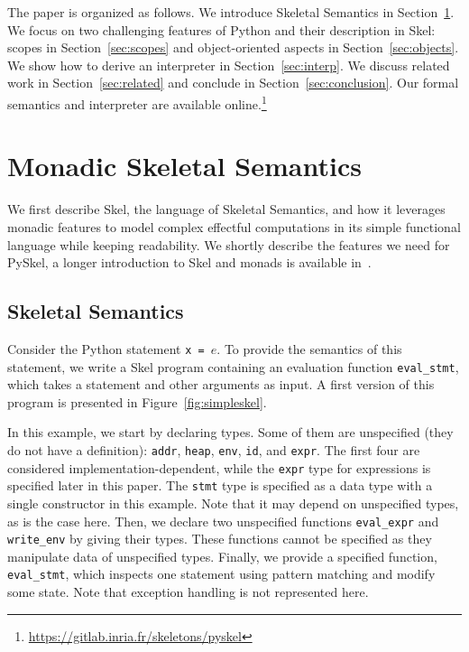 \documentclass[submission,copyright,creativecommons]{eptcs}
\newcommand{\skinl}[1]{\texttt{#1}}
\begin{document}
The paper is organized as follows. We introduce Skeletal Semantics in
Section~\ref{sec:skel}. We focus on two challenging features of Python and their
description in Skel: scopes in Section~\ref{sec:scopes} and
object-oriented aspects in Section~\ref{sec:objects}. We show how to derive an
interpreter in Section~\ref{sec:interp}. We discuss related work in
Section~\ref{sec:related} and conclude in Section~\ref{sec:conclusion}. Our
formal semantics and interpreter are available online.\footnote{\url{https://gitlab.inria.fr/skeletons/pyskel}}

\section{Monadic Skeletal Semantics}\label{sec:skel}
We first describe Skel, the language of Skeletal Semantics, and how it leverages
monadic features to model complex effectful computations in its simple
functional language while keeping readability. We shortly describe the features
we need for PySkel, a longer introduction to Skel and monads is available in~\cite{KhayamSchmitt2023}.

\subsection{Skeletal Semantics}
Consider the Python statement \texttt{x = \(e\)}.
To provide the semantics of this statement, we write a Skel program containing
an evaluation function \skinl{eval_stmt}, which takes a statement and other
arguments as input.
A first version of this program is presented in Figure~\vref{fig:simpleskel}.

In this example, we start by declaring types.
Some of them are unspecified (they do not have a definition): \skinl{addr},
\skinl{heap}, \skinl{env}, \skinl{id}, and \skinl{expr}. The first four are
considered implementation-dependent, while the \skinl{expr} type for expressions is
specified later in this paper.
The \skinl{stmt} type is specified as a data type with a single
constructor in this example. Note that it may depend on unspecified types, as is
the case here.
Then, we declare two unspecified functions \skinl{eval_expr} and
\skinl{write_env} by giving their types. These functions cannot be specified as
they manipulate data of unspecified types.
Finally, we provide a specified function, \skinl{eval_stmt}, which
inspects one statement using pattern matching and modify some state.
Note that exception handling is not represented here.
\end{document}
